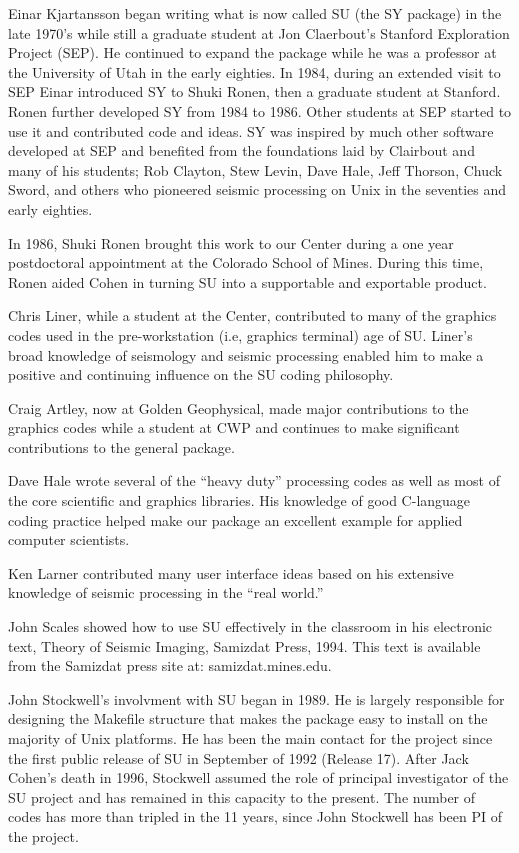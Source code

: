 Einar Kjartansson began writing what is now called SU
(the SY package) in the late 1970's while still a graduate student
at Jon Claerbout's Stanford Exploration Project (SEP). He continued 
to expand the package while he was a professor at the University of 
Utah in the early eighties.  In 1984, during an extended visit to SEP
Einar introduced SY to Shuki Ronen, then a graduate student at Stanford.
Ronen further developed SY from 1984 to 1986.   Other students at SEP
started to use it and contributed code and ideas.  SY was inspired by much
other software developed at SEP and benefited from the foundations laid by
Clairbout and many of his students; Rob Clayton, Stew Levin, Dave Hale, Jeff
Thorson, Chuck Sword, and others who pioneered seismic processing on Unix
in the seventies and early eighties.  

In 1986, Shuki Ronen brought this work to our Center during a
one year postdoctoral appointment at the Colorado School of Mines. 
During this time, Ronen aided Cohen in turning SU into a 
supportable and exportable product.

Chris Liner, while a student at the Center, contributed to many of the graphics
codes used in the pre-workstation (i.e, graphics terminal) age of  SU.
Liner's broad knowledge of seismology and seismic processing enabled
him to make a positive and continuing influence on the SU coding
philosophy.

Craig Artley, now at Golden Geophysical, made major contributions to
the graphics codes while a student at CWP and continues to make
significant contributions to the general package.

Dave Hale wrote several of the ``heavy duty'' processing codes as well
as most of the core scientific and graphics libraries.  His knowledge
of good C-language coding practice helped make our package an excellent
example for applied computer scientists.

Ken Larner contributed many user interface ideas based on his
extensive knowledge of seismic processing in the ``real world.''

John Scales showed how to use  SU effectively in the classroom in his
electronic text, Theory of Seismic Imaging, Samizdat Press, 1994.
This text is available from the Samizdat press site at:  samizdat.mines.edu.

John Stockwell's involvment with SU began in 1989. He is largely 
responsible for designing the Makefile structure that makes the 
package easy to install on the majority of Unix platforms.  He has 
been the main contact for the project since the first public release 
of SU in September of 1992 (Release 17).  After
Jack Cohen's death in 1996, Stockwell assumed the role of principal
investigator of the SU project and has remained in this capacity to
the present.   The number of codes has more than tripled in the 11
years, since John Stockwell has been PI of the project.

